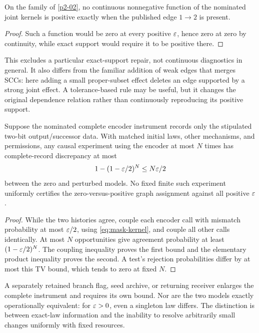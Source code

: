 \begin{remark}\label{p2-03}
On the family of \cref{p2-02}, no continuous nonnegative function of the nominated joint kernels is positive exactly when the published edge \(1\to2\) is present.
\end{remark}
\begin{proof}
Such a function would be zero at every positive \(\varepsilon\), hence zero at zero by continuity, while exact support would require it to be positive there.
\end{proof}

This excludes a particular exact-support repair, not continuous diagnostics in general. It also differs from the familiar addition of weak edges that merges SCCs: here adding a small proper-subset effect deletes an edge supported by a strong joint effect. A tolerance-based rule may be useful, but it changes the original dependence relation rather than continuously reproducing its positive support.

\begin{corollary}\label{p2-04}
Suppose the nominated complete encoder instrument records only the stipulated two-bit output/successor data. With matched initial laws, other mechanisms, and permissions, any causal experiment using the encoder at most \(N\) times has complete-record discrepancy at most
\begin{equation}\label{eq:mask-finite}
 1-(1-\varepsilon/2)^N\le N\varepsilon/2
\end{equation}
between the zero and perturbed models. No fixed finite such experiment uniformly certifies the zero-versus-positive graph assignment against all positive \(\varepsilon\).
\end{corollary}
\begin{proof}
While the two histories agree, couple each encoder call with mismatch probability at most \(\varepsilon/2\), using \cref{eq:mask-kernel}, and couple all other calls identically. At most \(N\) opportunities give agreement probability at least \((1-\varepsilon/2)^N\). The coupling inequality proves the first bound and the elementary product inequality proves the second. A test's rejection probabilities differ by at most this TV bound, which tends to zero at fixed \(N\).
\end{proof}

A separately retained branch flag, seed archive, or returning receiver enlarges the complete instrument and requires its own bound. Nor are the two models exactly operationally equivalent: for \(\varepsilon>0\), even a singleton law differs. The distinction is between exact-law information and the inability to resolve arbitrarily small changes uniformly with fixed resources.

